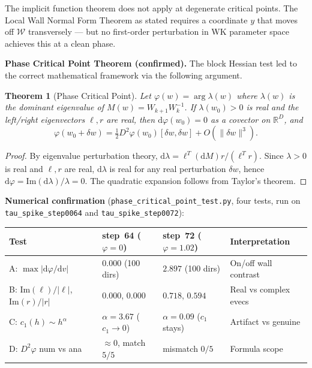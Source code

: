 \documentclass[11pt]{amsart}
\newtheorem{theorem}{Theorem}[section]
\begin{document}
The implicit function theorem does not apply at degenerate critical points.
The Local Wall Normal Form Theorem as stated requires a coordinate $y$
that moves off $\mathcal{W}$ transversely --- but no first-order
perturbation in WK parameter space achieves this at a clean phase.

\textbf{Phase Critical Point Theorem (confirmed).}
The block Hessian test led to the correct mathematical framework
via the following argument.

\begin{theorem}[Phase Critical Point]
\label{thm:phase_critical}
Let $\varphi(w) = \arg\lambda(w)$ where $\lambda(w)$ is the dominant
eigenvalue of $M(w) = W_{k+1}W_k^{-1}$.
If $\lambda(w_0) > 0$ is real and the left/right eigenvectors
$\ell, r$ are real, then $\mathrm{d}\varphi(w_0) = 0$ as a covector
on $\mathbb{R}^D$, and
\[
  \varphi(w_0 + \delta w) = \tfrac{1}{2}D^2\varphi(w_0)[\delta w,\delta w]
  + O(\|\delta w\|^3).
\]
\end{theorem}

\begin{proof}
By eigenvalue perturbation theory, $\mathrm{d}\lambda = \ell^T(\mathrm{d}M)r / (\ell^T r)$.
Since $\lambda > 0$ is real and $\ell, r$ are real, $\mathrm{d}\lambda$
is real for any real perturbation $\delta w$, hence
$\mathrm{d}\varphi = \mathrm{Im}(\mathrm{d}\lambda)/\lambda = 0$.
The quadratic expansion follows from Taylor's theorem.
\end{proof}

\textbf{Numerical confirmation} (\texttt{phase\_critical\_point\_test.py},
four tests, run on \texttt{tau\_spike\_step0064} and \texttt{tau\_spike\_step0072}):

\begin{center}
\small
\begin{tabular}{@{}llll@{}}
\toprule
Test & step~64 ($\varphi=0$) & step~72 ($\varphi=1.02$) & Interpretation \\
\midrule
A: $\max|\mathrm{d}\varphi/\mathrm{d}v|$
  & $0.000$ (100 dirs) & $2.897$ (100 dirs) & On/off wall contrast \\
B: $\mathrm{Im}(\ell)/|\ell|$, $\mathrm{Im}(r)/|r|$
  & $0.000$, $0.000$ & $0.718$, $0.594$ & Real vs complex evecs \\
C: $c_1(h) \sim h^\alpha$
  & $\alpha=3.67$ ($c_1\to0$) & $\alpha=0.09$ ($c_1$ stays) & Artifact vs genuine \\
D: $D^2\varphi$ num vs ana
  & $\approx0$, match $5/5$ & mismatch $0/5$ & Formula scope \\
\bottomrule
\end{tabular}
\end{center}
\end{document}
